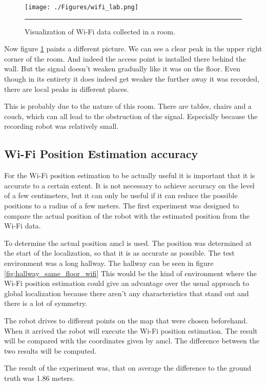 \begin{figure}[htbp]
	\centering
		\texttt{[image: ./Figures/wifi\_lab.png]}
		\rule{35em}{0.5pt}
	\caption[Hallway Wi-Fi data]{Visualization of Wi-Fi data collected in a room.}
	\label{fig:wifi_lab}
\end{figure}
Now figure \ref{fig:wifi_lab} paints a different picture. We can see a clear peak in the upper right corner of the room. And indeed the access point is installed there behind the wall. But the signal doesn't weaken gradually like it was on the floor. Even though in its entirety it does indeed get weaker the further away it was recorded, there are local peaks in different places. 

This is probably due to the nature of this room. There are tables, chairs and a couch, which can all lead to the obstruction of the signal. Especially because the recording robot was relatively small. 

\subsection{Wi-Fi Position Estimation accuracy}
For the Wi-Fi position estimation to be actually useful it is important that it is accurate to a certain extent. It is not necessary to achieve accuracy on the level of a few centimeters, but it can only be useful if it can reduce the possible positions to a radius of a few meters. The first experiment was designed to compare the actual position of the robot with the estimated position from the Wi-Fi data. 

To determine the actual position amcl is used. The position was determined at the start of the localization, so that it is as accurate as possible. The test environment was a long hallway. The hallway can be seen in figure \ref{fig:hallway_same_floor_wifi} This would be the kind of environment where the Wi-Fi position estimation could give an advantage over the usual approach to global localization because there aren't any characteristics that stand out and there is a lot of symmetry. 

The robot drives to different points on the map that were chosen beforehand. When it arrived the robot will execute the Wi-Fi position estimation. The result will be compared with the coordinates given by amcl. The difference between the two results will be computed.

The result of the experiment was, that on average the difference to the ground truth was 1.86 meters.
